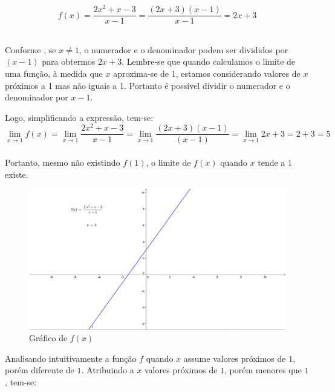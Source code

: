 $$ \displaystyle
f(x) = \frac{2x^2+x-3}{x-1} = \frac{(2x+3)(x-1)}{x-1} = 2x + 3
$$\\
\begin{citacao}
Conforme , se $x \neq 1$, o numerador e o denominador podem ser divididos por $(x-1)$ para obtermos $2x+3$. Lembre-se que quando calculamos o limite de uma função, à medida que $x$ aproxima-se de  1, estamos considerando valores de $x$ próximos a 1 mas não iguais a 1. Portanto é possível dividir o numerador e o denominador por $x-1$.
\end{citacao}
Logo, simplificando a expressão, tem-se:\\

$$
\displaystyle \lim_{x \to 1}f(x) = \lim_{x \to 1} \frac{2x^2+x-3}{x-1} = \lim_{x \to 1} \frac{(2x+3)(x-1)}{(x-1)} = \lim_{x \to  1} 2x+3 = 2 + 3 = 5
$$\\

Portanto, mesmo não existindo $f(1)$, o limite de $f(x)$ quando $x$ tende a 1 existe.

\begin{figure}[H]
\centering %
\includegraphics[width=15cm]{img/sub11.png} %
\caption{Gráfico de $f(x)$}
\label{fig:graph2}
\end{figure}

Analisando intuitivamente a função $f$ quando $x$  assume valores próximos de $1$, porém diferente de $1$. Atribuindo a $x$ valores próximos de $1$, porém menores que $1$, tem-se:

